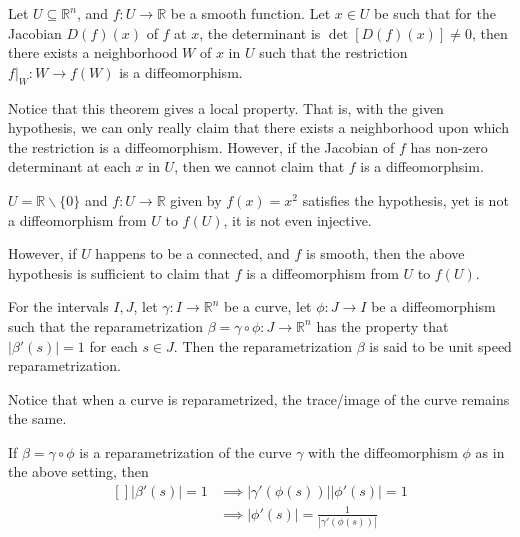 
\begin{theorem}
    Let $U\subseteq\mathbb{R}^{n}$, and $f:U\to\mathbb{R}$ be a smooth function. Let $x\in U$ be such that for the Jacobian $D(f)(x)$ of $f$ at $x$, the determinant is $\det[D(f)(x)]\neq0$, then there exists a neighborhood $W$ of $x$ in $U$ such that the restriction $f|_{W}:W\to f(W)$ is a diffeomorphism.
\end{theorem}
\vspace{0.4cm}
\begin{note}[]
    Notice that this theorem gives a local property. That is, with the given hypothesis, we can only really claim that there exists a neighborhood upon which the restriction is a diffeomorphism. However, if the Jacobian of $f$ has non-zero determinant at each $x$ in $U$, then we cannot claim that $f$ is a diffeomorphsim.
\end{note}
\vspace{0.4cm}
\begin{eg}[]
    $U=\mathbb{R}\backslash\{0\}$ and $f:U\to\mathbb{R}$ given by $f(x)=x^{2}$ satisfies the hypothesis, yet is not a diffeomorphism from $U$ to $f(U)$, it is not even injective.
\end{eg}
\vspace{0.4cm}
\begin{observe}[]
    However, if $U$ happens to be a connected, and $f$ is smooth, then the above hypothesis is sufficient to claim that $f$ is a diffeomorphism from $U$ to $f(U)$.
\end{observe}
\vspace{0.4cm}
\begin{definition}
    For the intervals $I, J$, let $\gamma:I\to \mathbb{R}^{n}$ be a curve, let $\phi:J\to I$ be a diffeomorphism such that the reparametrization $\beta=\gamma\circ\phi:J\to\mathbb{R}^{n}$ has the property that $|\beta'(s)|=1$ for each $s\in J$. Then the reparametrization $\beta$ is said to be unit speed reparametrization.
\end{definition}
\vspace{0.4cm}
\begin{note}[]
    Notice that when a curve is reparametrized, the trace/image of the curve remains the same.
\end{note}
\vspace{0.4cm}
\begin{note}
    If $\beta=\gamma\circ\phi$ is a reparametrization of the curve $\gamma$ with the diffeomorphism $\phi$ as in the above setting, then $$\begin{aligned}[]
        |\beta'(s)|=1&\implies|\gamma'(\phi(s))||\phi'(s)| = 1\\ 
                     &\implies \boxed{|\phi'(s)|=\frac{1}{|\gamma'(\phi(s))|}}
    \end{aligned}
    $$
\end{note}
